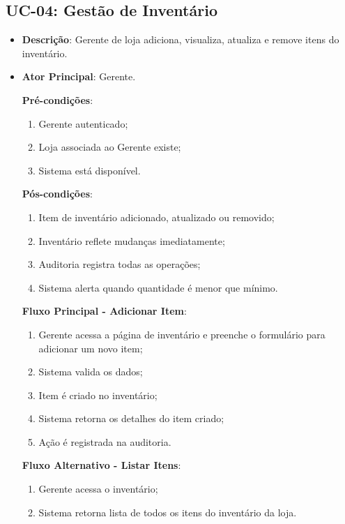 \subsection{UC-04: Gestão de Inventário}

\begin{itemize}[topsep=1pt, itemsep=0pt]
  \item[]\textbf{Descrição}: Gerente de loja adiciona, visualiza, atualiza e remove itens do inventário.

  \item[]\textbf{Ator Principal}: Gerente.

  \textbf{Pré-condições}:
  \begin{enumerate}
    \item Gerente autenticado;
    \item Loja associada ao Gerente existe;
    \item Sistema está disponível.
  \end{enumerate}

  \textbf{Pós-condições}:
  \begin{enumerate}
    \item Item de inventário adicionado, atualizado ou removido;
    \item Inventário reflete mudanças imediatamente;
    \item Auditoria registra todas as operações;
    \item Sistema alerta quando quantidade é menor que mínimo.
  \end{enumerate}

  \textbf{Fluxo Principal - Adicionar Item}:
  \begin{enumerate}
    \item Gerente acessa a página de inventário e preenche o formulário para adicionar um novo item;
    \item Sistema valida os dados;
    \item Item é criado no inventário;
    \item Sistema retorna os detalhes do item criado;
    \item Ação é registrada na auditoria.
  \end{enumerate}

  \textbf{Fluxo Alternativo - Listar Itens}:
  \begin{enumerate}
    \item Gerente acessa o inventário;
    \item Sistema retorna lista de todos os itens do inventário da loja.
  \end{enumerate}


\end{itemize}
